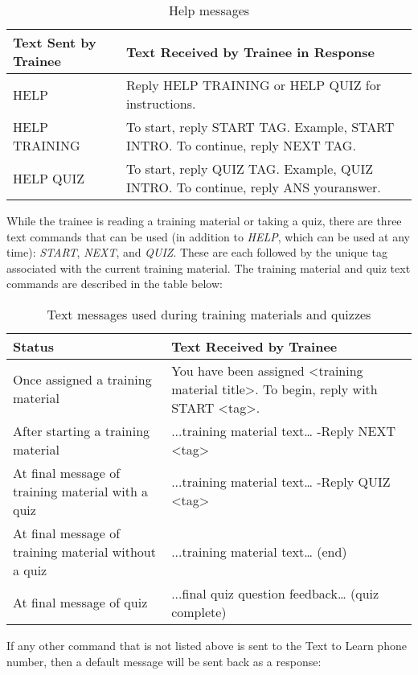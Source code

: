 \begin{table}[H]
	\centering
	\begin{tabular}{ | l | p{7cm} |}
		\hline
		\textbf{Text Sent by Trainee} & \textbf{Text Received by Trainee in Response} \\ \hline
		HELP & Reply HELP TRAINING or HELP QUIZ for instructions. \\ \hline
		HELP TRAINING & To start, reply START TAG. Example, START INTRO. To continue, reply NEXT TAG. \\ \hline
		HELP QUIZ & To start, reply QUIZ TAG. Example, QUIZ INTRO. To continue, reply ANS youranswer. \\ \hline
	\end{tabular}
	\caption{Help messages}
\end{table}

While the trainee is reading a training material or taking a quiz, there are three text commands that can be used (in addition to \textit{HELP}, which can be used at any time): \textit{START}, \textit{NEXT}, and \textit{QUIZ}. These are each followed by the unique tag associated with the current training material. The training material and quiz text commands are described in the table below:

\begin{table}[H]
	\centering
	\begin{tabular}{ | p{5cm} | p{7cm} |}
		\hline
		\textbf{Status} & \textbf{Text Received by Trainee} \\ \hline
		Once assigned a training material & You have been assigned \textless training material title\textgreater. To begin, reply with START \textless tag\textgreater.  \\ \hline
		After starting a training material & ...training material text… -Reply NEXT \textless tag\textgreater \\ \hline
		At final message of training material with a quiz & ...training material text… -Reply QUIZ \textless tag\textgreater  \\ \hline
		At final message of training material without a quiz & ...training material text… (end) \\ \hline
		At final message of quiz & ...final quiz question feedback… (quiz complete)  \\ \hline
	\end{tabular}
	\caption{Text messages used during training materials and quizzes}
\end{table}

If any other command that is not listed above is sent to the Text to Learn phone number, then a default message will be sent back as a response:


